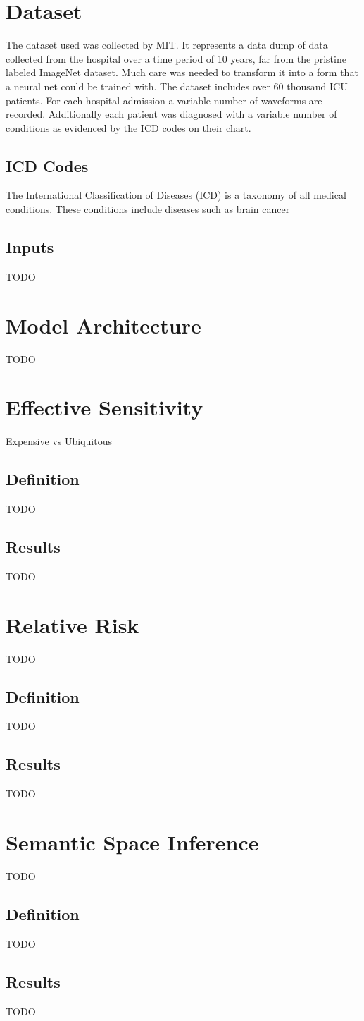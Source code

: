 \section{Dataset}
The dataset used was collected by MIT.  It represents a data dump of data collected from the hospital over a time period of 10 years, far from the pristine labeled ImageNet dataset.  Much care was needed to transform it into a form that a neural net could be trained with.  The dataset includes over 60 thousand ICU patients.  For each hospital admission a variable number of waveforms are recorded.  Additionally each patient was diagnosed with a variable number of conditions as evidenced by the ICD codes on their chart.

\subsection{ICD Codes}
The International Classification of Diseases (ICD) is a taxonomy of all medical conditions.  These conditions include diseases such as brain cancer

\subsection{Inputs}
TODO

\section{Model Architecture}
TODO

\section{Effective Sensitivity}
Expensive vs Ubiquitous

\subsection{Definition}
TODO

\subsection{Results}
TODO

\section{Relative Risk}
TODO

\subsection{Definition}
TODO

\subsection{Results}
TODO

\section{Semantic Space Inference}
TODO

\subsection{Definition}
TODO

\subsection{Results}
TODO